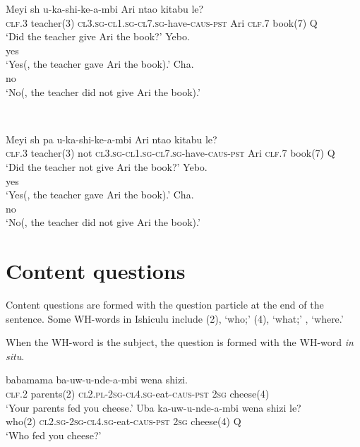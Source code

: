 \begin{exe}
\ex
\begin{xlist}
\ex
\gll Meyi {sh\textramshorns} u-ka-shi-ke-\textbeltl a-mbi Ari nta\textbeltl o kitabu le? \\
\textsc{clf.3} teacher(3) \textsc{cl3.sg}-\textsc{cl1.sg}-\textsc{cl7.sg}-have-\textsc{caus}-\textsc{pst} Ari \textsc{clf.7} book(7) Q \\
\trans `Did the teacher give Ari the book?'
\ex
\gll Yebo. \\
yes \\
\trans `Yes(, the teacher gave Ari the book).'
\ex
\gll Cha. \\
no \\
\trans `No(, the teacher did not give Ari the book).'
\end{xlist}

\ 
\\

\ex
\begin{xlist}
\ex
\gll Meyi {sh\textramshorns} pa u-ka-shi-ke-\textbeltl a-mbi Ari nta\textbeltl o kitabu le? \\
\textsc{clf.3} teacher(3) not \textsc{cl3.sg}-\textsc{cl1.sg}-\textsc{cl7.sg}-have-\textsc{caus}-\textsc{pst} Ari \textsc{clf.7} book(7) Q \\
\trans `Did the teacher not give Ari the book?'
\ex
\gll Yebo. \\
yes \\
\trans `Yes(, the teacher gave Ari the book).'
\ex
\gll Cha. \\
no \\
\trans `No(, the teacher did not give Ari the book).'
\end{xlist}
\end{exe}

\section{Content questions}

Content questions are formed with the question particle \textit{\textipa{le}} at the end of the sentence. Some WH-words in Ishiculu include \textit{\textipa{uba}}(2), `who;' \textit{\textipa{uni}}(4), `what;' \textit{\textipa{una}}, `where.'

When the WH-word is the subject, the question is formed with the WH-word \textit{in situ}.

\begin{exe}
\ex
\begin{xlist}
\ex
{} babamama ba-uw-u-nde-\textipa{\textbeltl}a-mbi wena shizi. \\
\textsc{clf.2} parents(2) \textsc{cl2.pl}-\textsc{2sg}-\textsc{cl4.sg}-eat-\textsc{caus}-\textsc{pst} \textsc{2sg} cheese(4) \\
\trans `Your parents fed you cheese.'
\ex
\gll Uba ka-uw-u-nde-\textipa{\textbeltl}a-mbi wena shizi le? \\
who(2) \textsc{cl2.sg}-\textsc{2sg}-\textsc{cl4.sg}-eat-\textsc{caus}-\textsc{pst} \textsc{2sg} cheese(4) Q \\
\trans `Who fed you cheese?'
\end{xlist}
\end{exe}

